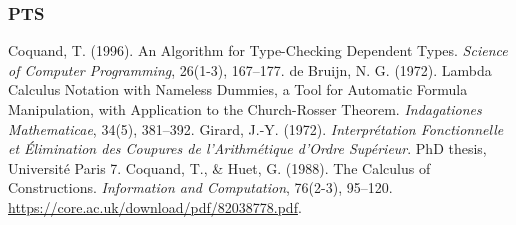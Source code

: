 \documentclass{article}
\begin{document}
\begin{thebibliography}{9}
\subsubsection*{PTS}
 Coquand, T. (1996). An Algorithm for Type-Checking Dependent Types. \emph{Science of Computer Programming}, 26(1-3), 167--177.
 de Bruijn, N. G. (1972). Lambda Calculus Notation with Nameless Dummies, a Tool for Automatic Formula Manipulation, with Application to the Church-Rosser Theorem. \emph{Indagationes Mathematicae}, 34(5), 381--392.
 Girard, J.-Y. (1972). \emph{Interprétation Fonctionnelle et Élimination des Coupures de l’Arithmétique d’Ordre Supérieur}. PhD thesis, Université Paris 7.
 Coquand, T., \& Huet, G. (1988). The Calculus of Constructions. \emph{Information and Computation}, 76(2-3), 95--120. \url{https://core.ac.uk/download/pdf/82038778.pdf}.
\end{thebibliography}
\end{document}
